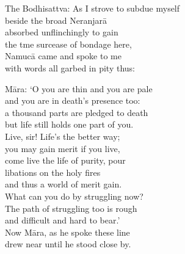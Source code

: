 \begin{MyDescription}[]{The Bodhisattva:}
As I strove to subdue myself\\
beside the broad Neranjar\=a\\
absorbed unﬂinchingly to gain\\
the tme surcease of bondage here,\\
Namuc\=a came and spoke to me\\
with words all garbed in pity thus:
\end{MyDescription}

\begin{MyDescription}[]{M\=ara:}
`O you are thin and you are pale\\
and you are in death's presence too:\\
a thousand parts are pledged to death\\
but life still holds one part of you.\\
Live, sir! Life's the better way;\\
you may gain merit if you live,\\
come live the life of purity, pour\\
libations on the holy ﬁres\\
and thus a world of merit gain.\\
What can you do by struggling now?\\
The path of struggling too is rough\\
and difficult and hard to bear.'\\
Now M\=ara, as he spoke these line\\
drew near until he stood close by.
\end{MyDescription}

